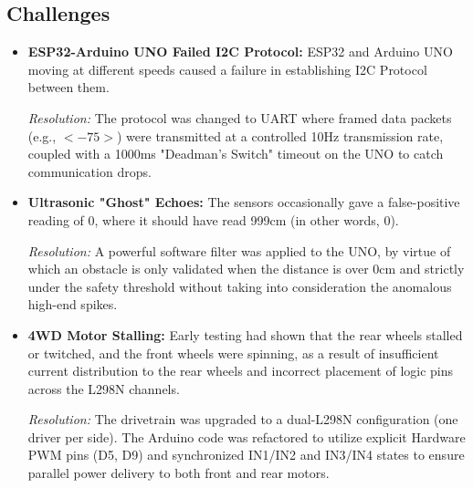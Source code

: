 \documentclass[12pt,a4paper]{article}
\begin{document}
\subsection{Challenges}
\begin{itemize}
    \item \textbf{ESP32-Arduino UNO Failed I2C Protocol:} ESP32 and Arduino UNO moving at different speeds caused a failure in establishing I2C Protocol between them.

    \textit{Resolution:} The protocol was changed to UART where framed data packets (e.g., $<-75>$) were transmitted at a controlled 10Hz transmission rate, coupled with a 1000ms "Deadman's Switch" timeout on the UNO to catch communication drops.

    \item \textbf{Ultrasonic "Ghost" Echoes:}  The sensors occasionally gave a false-positive reading of 0, where it should have read 999cm (in other words, 0).

    \textit{Resolution:}  A powerful software filter was applied to the UNO, by virtue of which an obstacle is only validated when the distance is over 0cm and strictly under the safety threshold without taking into consideration the anomalous high-end spikes.

    \item \textbf{4WD Motor Stalling:} Early testing had shown that the rear wheels stalled or twitched, and the front wheels were spinning, as a result of insufficient current distribution to the rear wheels and incorrect placement of logic pins across the L298N channels.

    \textit{Resolution:} The drivetrain was upgraded to a dual-L298N configuration (one driver per side). The Arduino code was refactored to utilize explicit Hardware PWM pins (D5, D9) and synchronized IN1/IN2 and IN3/IN4 states to ensure parallel power delivery to both front and rear motors.

\end{itemize}
\end{document}
